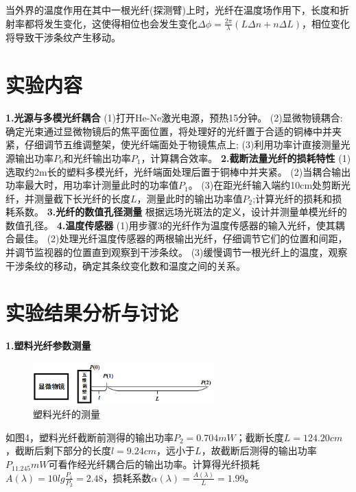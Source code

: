 \documentclass[UTF8]{ctexart}
\begin{document}
\begin{multicols}{2}
当外界的温度作用在其中一根光纤(探测臂)上时，光纤在温度场作用下，长度和折射率都将发生变化，这使得相位也会发生变化$\Delta\phi=\frac{2\pi}{\lambda}(L\Delta n+n\Delta L)$，相位变化将导致干涉条纹产生移动。

\section{实验内容}
\noindent\textbf{1.光源与多模光纤耦合}
\newline(1)打开He-Ne激光电源，预热15分钟。
\newline(2)显微物镜耦合:确定光束通过显微物镜后的焦平面位置，将处理好的光纤置于合适的铜棒中并夹紧，仔细调节五维调整架，使光纤端面处于物镜焦点上;
\newline(3)利用功率计直接测量光源输出功率$P_0$和光纤输出功率$P_1$，计算耦合效率。
\newline\textbf{2.截断法量光纤的损耗特性}
\newline(1)选取约2m长的塑料多模光纤，光纤端面处理后置于铜棒中并夹紧。
\newline(2)当耦合输出功率最大时，用功率计测量此时的功率值$P_1$。
\newline(3)在距光纤输入端约10cm处剪断光纤，并测量截下长光纤的长度$L$，测量此时的输出功率值$P_2$;计算光纤的损耗和损耗系数。
\newline\textbf{3.光纤的数值孔径测量}
\newline 根据远场光斑法的定义，设计并测量单模光纤的数值孔径。
\newline\textbf{4.温度传感器}
\newline(1)用步骤3的光纤作为温度传感器的输入光纤，使其耦合最佳。
\newline(2)处理光纤温度传感器的两根输出光纤，仔细调节它们的位置和间距，并调节监视器的位置直到观察到干涉条纹。
\newline(3)缓慢调节一根光纤上的温度，观察干涉条纹的移动，确定其条纹变化数和温度之间的关系。

\section{实验结果分析与讨论}
\noindent\textbf{1.塑料光纤参数测量}
\begin{figure}[H]
\centering
\includegraphics[width=7cm]{p}
\caption{塑料光纤的测量}
\end{figure}
如图4，塑料光纤截断前测得的输出功率$P_2=0.704mW$；截断长度$L=124.20cm$，截断后剩下部分的长度$l=9.24cm$，远小于$L$，故截断后测得的输出功率$P_11.245mW$可看作经光纤耦合后的输出功率。计算得光纤损耗$A(\lambda)=10lg\frac{P_1}{P_2}=2.48$，损耗系数$\alpha(\lambda)=\frac{A(\lambda)}{L}=1.99$。


\end{multicols}
\end{document}

